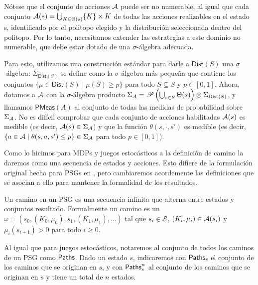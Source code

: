Nótese que el conjunto de acciones \( \mathcal{A} \) puede ser no numerable, al igual
que cada conjunto \( \mathcal{A}(s) = \bigcup_{K \in \Theta(s)} \{K\} \times K \) de
todas las acciones realizables en el estado s, identificado por el politopo
elegido y la distribución seleccionada dentro del politopo. Por lo tanto,
necesitamos extender las estrategias a este dominio no numerable, que debe
estar dotado de una \( \sigma \)-álgebra adecuada.

Para esto, utilizamos una construcción estándar para darle a \(
\textsf{Dist}(S) \) una \( \sigma \)-álgebra: \( \Sigma_{\textsf{Dist}(S)} \)
se define como la \( \sigma \)-álgebra más pequeña que contiene los conjuntos
\( \{\mu \in \textsf{Dist}(S) \mid \mu(S) \geq p\} \) para todo \( S \subseteq
S \) y \( p \in [0, 1] \). Ahora, dotamos a \( \mathcal{A} \) con la \( \sigma
\)-álgebra producto \( \Sigma_{\mathcal{A}} = \mathscr{P} \left(\bigcup_{s \in S}
\Theta(s)\right) \otimes \Sigma_{\text{Dist}(S)} \), y llamamos \(
\textsf{PMeas}(A) \) al conjunto de todas las medidas de probabilidad sobre \(
\Sigma_{\mathcal{A}} \). No es difícil comprobar que cada conjunto de acciones
habilitadas \( \mathcal{A}(s) \) es medible (es decir, \( \mathcal{A}(s) \in \Sigma_{\mathcal{A}} \))
y que la función \( \theta(s, \cdot, s') \) es medible (es decir, \( \{a \in
\mathcal{A} \mid \theta(s, a, s') \leq p\} \in \Sigma_{\mathcal{A}} \) para todo \( p \in [0,
	1] \)).

Como lo hicimos para MDPs y juegos estocásticos a la definición de camino la
daremos como una secuencia de estados y acciones. Esto difiere de la
formulación original hecha para PSGs en \cite{Polytopal}, pero cambiaremos
acordemente las definiciones que se asocian a ello para mantener la formalidad
de los resultados.

\begin{definition}
	Un camino en un PSG es una secuencia infinita que alterna entre estados y conjuntos resultado. Formalmente un camino es un $\omega = (s_0, (K_0, \mu_0), s_1, (K_1, \mu_1), \dots)$ tal que $s_i \in \mathcal{S}$, $(K_i, \mu_i) \in \mathcal{A}(s_i)$ y $\mu_i(s_{i+1}) > 0$ para todo $i \geq 0$.

	Al igual que para juegos estocásticos, notaremos al conjunto de todos los
	caminos de un PSG como $\textsf{Paths}$. Dado un estado $s$, indicaremos con $\textsf{Paths}_s$
	el conjunto de los caminos que se originan en $s$, y con $\textsf{Paths}_s^n$ al
	conjunto de los caminos que se originan en $s$ y tiene un total de $n$ estados.
\end{definition}

